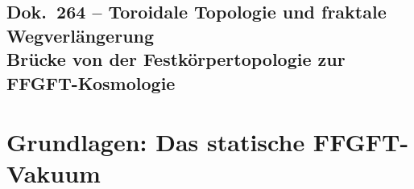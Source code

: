 
\chapter*{Dok.~264 -- Toroidale Topologie und fraktale Wegverlängerung\\
\large Brücke von der Festkörpertopologie zur FFGFT-Kosmologie}

\begin{abstract}
\noindent
Dieses Dokument entwickelt die konzeptionelle und mathematische Verbindung zwischen
der experimentell nachgewiesenen Ferrotoroidizität in Antiferromagneten
\cite{Qureshi2026} und der Fundamental Fractal Geometric Field Theory (FFGFT).
Das statische sub-Planck-Gitter des FFGFT-Vakuums weist dieselben
topologischen Prinzipien auf -- toroidale Spin-Ringe, Dzyaloshinskii-Moriya-Kopplung,
quaternäre Domänensymmetrie und topologischen Schutz -- die Qureshi et al.~auf
atomarer Skala experimentell belegt haben.
Die kosmologische Rotverschiebung entsteht dabei nicht durch eine physische
Expansion des Raumes, sondern durch eine geometrische, fraktale Verlängerung
der Lichtwege im statischen Gitter.
\end{abstract}

\part{Grundlagen: Das statische FFGFT-Vakuum}


